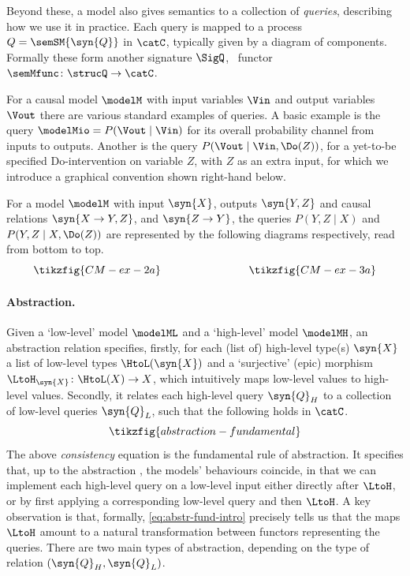 \documentclass{article}
\begin{document}
Beyond these, a model also gives semantics to a collection of \emph{queries}, describing how we use it in practice. Each query is mapped to a process $Q=\semSM{\syn{Q}}$ in $\catC$, typically given by a diagram of components. Formally these form another signature $\SigQ$, \ functor $\semMfunc \colon \strucQ \to \catC$. 

For a causal model $\modelM$ with input variables $\Vin$ and output variables $\Vout$ there are various standard examples of queries. A basic example is the query $\modelMio = P(\Vout \mid \Vin)$ for its overall probability channel from inputs to outputs. Another is the query $P(\Vout \mid \Vin, \Do(Z))$, for a yet-to-be specified Do-intervention on variable $Z$, with $Z$ as an extra input, for which we introduce a graphical convention shown right-hand below. 

For a model $\modelM$ with input $\syn{X}$, outputs $\syn{Y,Z}$ and causal relations $\syn{X \to Y, Z}$, and $\syn{Z \to Y}$, the queries $P(Y, Z \mid X)$ and $P(Y, Z \mid X, \Do(Z))$ are represented by the 
following diagrams respectively, read from bottom to top. 
\[
\tikzfig{CM-ex-2a}
\qquad \qquad \qquad \qquad 
\tikzfig{CM-ex-3a}
\]


\paragraph{Abstraction.} Given a `low-level' model $\modelML$ and a `high-level' model $\modelMH$, an abstraction relation specifies, firstly, for each (list of) high-level type(s) $\syn{X}$ a list of low-level types $\HtoL(\syn{X})$ and a `surjective' (epic) morphism $\LtoH_{\syn{X}} \colon \HtoL(X) \to X$, which intuitively maps low-level values to high-level values. Secondly, it relates each high-level query $\syn{Q}_H$ to a collection of low-level queries $\syn{Q}_L$, such that the following holds in $\catC$. 
\begin{equation} \label{eq:abstr-fund-intro}
 \tikzfig{abstraction-fundamental}
\end{equation}
The above \emph{consistency} equation is the fundamental rule of abstraction. It specifies that, up to the abstraction , the models' behaviours coincide, in that we can implement each high-level query on a low-level input either directly after $\LtoH$, or by first applying a corresponding low-level query and then $\LtoH$. A key observation is that, formally, \eqref{eq:abstr-fund-intro} precisely tells us that the maps $\LtoH$ amount to a natural transformation between functors representing the queries. There are two main types of abstraction, depending on the type of relation $(\syn{Q}_H, \syn{Q}_L)$. 
\end{document}
